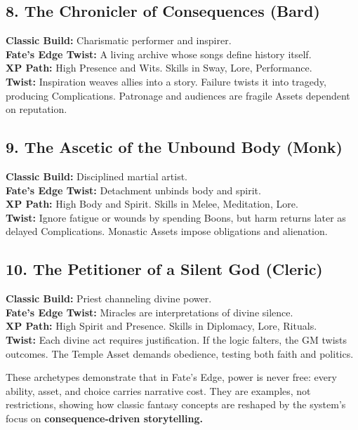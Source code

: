 \documentclass[11pt]{book}
\begin{document}
\subsection{8. The Chronicler of Consequences (Bard)}

\textbf{Classic Build:} Charismatic performer and inspirer.\\
\textbf{Fate’s Edge Twist:} A living archive whose songs define history itself.\\
\textbf{XP Path:} High Presence and Wits. Skills in Sway, Lore, Performance.\\
\textbf{Twist:} Inspiration weaves allies into a story. Failure twists it into tragedy,
producing Complications. Patronage and audiences are fragile Assets dependent on reputation.

\subsection{9. The Ascetic of the Unbound Body (Monk)}

\textbf{Classic Build:} Disciplined martial artist.\\
\textbf{Fate’s Edge Twist:} Detachment unbinds body and spirit.\\
\textbf{XP Path:} High Body and Spirit. Skills in Melee, Meditation, Lore.\\
\textbf{Twist:} Ignore fatigue or wounds by spending Boons, but harm
returns later as delayed Complications. Monastic Assets impose obligations and alienation.

\subsection{10. The Petitioner of a Silent God (Cleric)}

\textbf{Classic Build:} Priest channeling divine power.\\
\textbf{Fate’s Edge Twist:} Miracles are interpretations of divine silence.\\
\textbf{XP Path:} High Spirit and Presence. Skills in Diplomacy, Lore, Rituals.\\
\textbf{Twist:} Each divine act requires justification. If the logic falters, the GM twists
outcomes. The Temple Asset demands obedience, testing both faith and politics.

\bigskip

\noindent
These archetypes demonstrate that in Fate’s Edge, power is never free: every
ability, asset, and choice carries narrative cost. They are examples, not
restrictions, showing how classic fantasy concepts are reshaped by the
system’s focus on \textbf{consequence-driven storytelling.}
\end{document}

